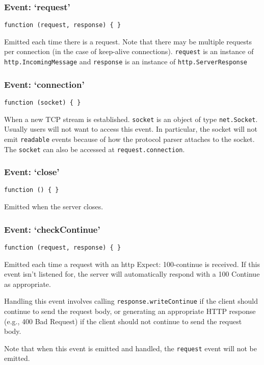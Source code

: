 \subsubsection{Event: `request'}

\texttt{function (request, response) \{ \}}

Emitted each time there is a request. Note that there may be multiple
requests per connection (in the case of keep-alive connections).
\texttt{request} is an instance of \texttt{http.IncomingMessage} and
\texttt{response} is an instance of \texttt{http.ServerResponse}

\subsubsection{Event: `connection'}

\texttt{function (socket) \{ \}}

When a new TCP stream is established. \texttt{socket} is an object of
type \texttt{net.Socket}. Usually users will not want to access this
event. In particular, the socket will not emit \texttt{readable} events
because of how the protocol parser attaches to the socket. The
\texttt{socket} can also be accessed at \texttt{request.connection}.

\subsubsection{Event: `close'}

\texttt{function () \{ \}}

Emitted when the server closes.

\subsubsection{Event: `checkContinue'}

\texttt{function (request, response) \{ \}}

Emitted each time a request with an http Expect: 100-continue is
received. If this event isn't listened for, the server will
automatically respond with a 100 Continue as appropriate.

Handling this event involves calling \texttt{response.writeContinue} if
the client should continue to send the request body, or generating an
appropriate HTTP response (e.g., 400 Bad Request) if the client should
not continue to send the request body.

Note that when this event is emitted and handled, the \texttt{request}
event will not be emitted.

